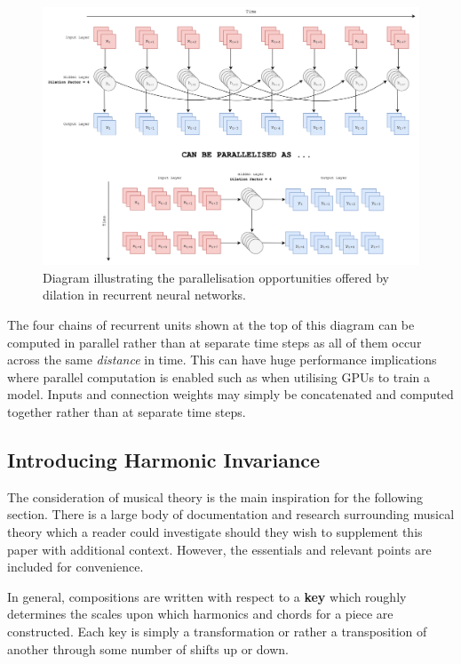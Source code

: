 \documentclass[12pt,]{article}
\begin{document}
\begin{figure}
\centering
\includegraphics{Images/dilatedrnnparallel.png}
\caption{Diagram illustrating the parallelisation opportunities offered
by dilation in recurrent neural networks.}
\end{figure}

The four chains of recurrent units shown at the top of this diagram can
be computed in parallel rather than at separate time steps as all of
them occur across the same \emph{distance} in time. This can have huge
performance implications where parallel computation is enabled such as
when utilising GPUs to train a model. Inputs and connection weights may
simply be concatenated and computed together rather than at separate
time steps.

\hypertarget{introducing-harmonic-invariance}{%
\subsection{Introducing Harmonic
Invariance}\label{introducing-harmonic-invariance}}

The consideration of musical theory is the main inspiration for the
following section. There is a large body of documentation and research
surrounding musical theory which a reader could investigate should they
wish to supplement this paper with additional context. However, the
essentials and relevant points are included for convenience.

In general, compositions are written with respect to a \textbf{key}
which roughly determines the scales upon which harmonics and chords for
a piece are constructed. Each key is simply a transformation or rather a
transposition of another through some number of shifts up or down.
\end{document}
